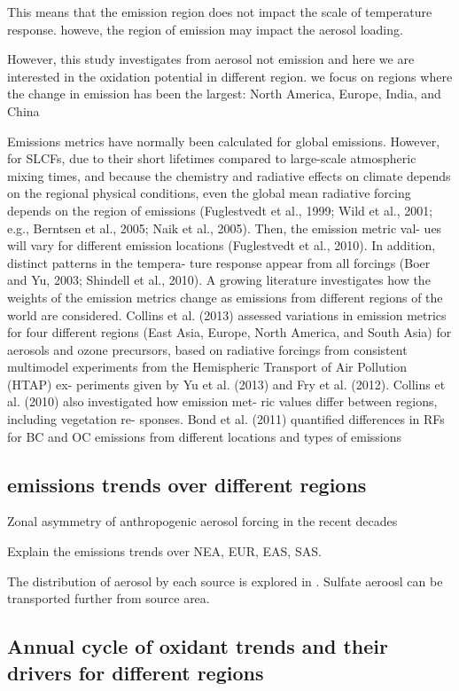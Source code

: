 This means that the emission region does not impact the scale of temperature response. howeve, the region of emission may impact the aerosol loading.

However, this study investigates from aerosol not emission and here we are interested in the oxidation potential in different region. we focus on regions where the change in emission has been the largest: North America, Europe, India, and China



Emissions metrics have normally been calculated for
global emissions. However, for SLCFs, due to their short
lifetimes compared to large-scale atmospheric mixing times,
and because the chemistry and radiative effects on climate
depends on the regional physical conditions, even the global
mean radiative forcing depends on the region of emissions
(Fuglestvedt et al., 1999; Wild et al., 2001; e.g., Berntsen et
al., 2005; Naik et al., 2005). Then, the emission metric val-
ues will vary for different emission locations (Fuglestvedt
et al., 2010). In addition, distinct patterns in the tempera-
ture response appear from all forcings (Boer and Yu, 2003;
Shindell et al., 2010). A growing literature investigates how
the weights of the emission metrics change as emissions
from different regions of the world are considered. Collins
et al. (2013) assessed variations in emission metrics for four
different regions (East Asia, Europe, North America, and
South Asia) for aerosols and ozone precursors, based on
radiative forcings from consistent multimodel experiments
from the Hemispheric Transport of Air Pollution (HTAP) ex-
periments given by Yu et al. (2013) and Fry et al. (2012).
Collins et al. (2010) also investigated how emission met-
ric values differ between regions, including vegetation re-
sponses. Bond et al. (2011) quantified differences in RFs for
BC and OC emissions from different locations and types of
emissions

\subsection{\texorpdfstring{}{SO2} emissions trends over different regions}

Zonal asymmetry of anthropogenic aerosol forcing in the recent decades \citep{diaoAnthropogenicAerosolEffects2021}


Explain the emissions trends over NEA, EUR, EAS, SAS. 

The distribution of aerosol by each source is explored in \citet{yangGlobalSourceAttribution2017}. Sulfate aeroosl can be transported further from source area.


\subsection{Annual cycle of oxidant trends and their drivers for different regions}


